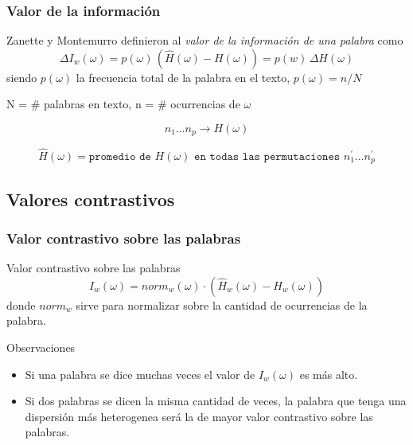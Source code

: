 \begin{frame}[t]\frametitle{Valor de la información}

Zanette y Montemurro definieron al \textit{valor de la información de una palabra} como
 \begin{equation}
  \Delta I_w(\omega) = p(\omega) \,  (\widehat{H}(\omega) - H(\omega))  =  p(w) \, \Delta{H(\omega)}
 \end{equation}
siendo $p(\omega)$ la frecuencia total de la palabra en el texto, $p(\omega) = n/N$ 

N = \# palabras en texto,
n = \# ocurrencias de $\omega$

\begin{equation}
 n_1 \ldots n_p \rightarrow H(\omega)   
\end{equation}

\begin{equation}
  \widehat{H}(\omega) = \texttt{promedio de $H(\omega)$ en todas las permutaciones } n_1^\prime \ldots n_p^\prime  
\end{equation}



\end{frame}

\subsection{Valores contrastivos}
\begin{frame}[t]\frametitle{Valor contrastivo sobre las palabras}
    \begin{alertblock}{Valor contrastivo sobre las palabras}
        \begin{equation}
            I_w(\omega) = norm_{w}(\omega) \cdot (\widehat{H}_{w}(\omega) - H_{w}(\omega))
            \label{eq:iw}
        \end{equation}
        donde $norm_w$ sirve para normalizar sobre la cantidad de ocurrencias de la palabra.
    \end{alertblock}

    \begin{block}{Observaciones}
        \begin{itemize}
            \item Si una palabra se dice muchas veces el valor de $I_w(\omega)$ es más alto.
            \item Si dos palabras se dicen la misma cantidad de veces, la palabra que tenga una dispersión más heterogenea será la de mayor valor contrastivo sobre las palabras.
        \end{itemize}
    \end{block}

\end{frame}


